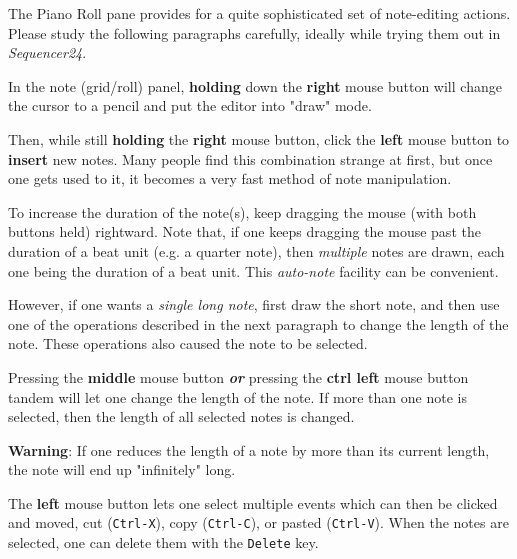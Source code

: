    The Piano Roll pane provides for a quite sophisticated set of note-editing
   actions.  Please study the following paragraphs carefully, ideally while
   trying them out in \textsl{Sequencer24}.

	In the note (grid/roll) panel, \textbf{holding}
	down the \textbf{right} mouse button will change the cursor
	to a pencil and put the editor into "draw" mode.
   
   Then, while still \textbf{holding} the \textbf{right} mouse button, click
   the \textbf{left} mouse button to \textbf{insert} new notes.  Many people
   find this combination strange at first, but once one gets used to it, it
   becomes a very fast method of note manipulation.

   To increase the duration of the note(s), keep dragging the mouse (with
   both buttons held) rightward.
   Note that, if one keeps dragging the mouse past the duration of a
   beat unit (e.g. a quarter note), then \textsl{multiple} notes are drawn,
   each one being the duration of a beat unit.  This \textsl{auto-note}
   facility can be convenient.
   
   However, if one wants a \textsl{single long note}, first draw the
   short note, and then use one of the operations described in the next
   paragraph to change the length of the note.  These operations also caused
   the note to be selected.

   Pressing the \textbf{middle} mouse button \textbf{\textsl{or}}
   pressing the \textbf{ctrl left} mouse button tandem will let one change 
	the length of the note. 
   If more than one note is selected, then the length of all selected notes
   is changed.
   
   \textbf{Warning}:  If one reduces the length of a note by more than its
   current length, the note will end up "infinitely" long.

	The \textbf{left} mouse button lets one select multiple events 
   which can then be clicked and moved,
    cut (\texttt{Ctrl-X}), 
    copy (\texttt{Ctrl-C}),
    or pasted (\texttt{Ctrl-V}).
   When the notes are selected,
   one can delete them with the \texttt{Delete} key.


